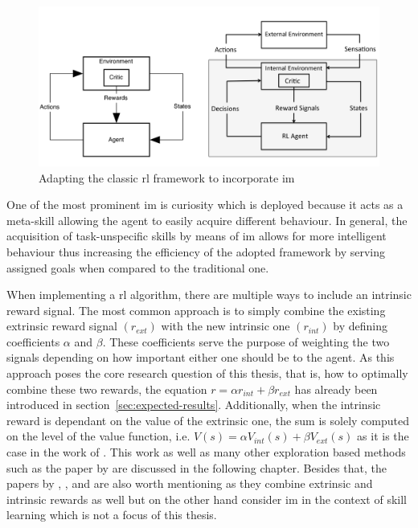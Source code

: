 \documentclass[draft,final]{vutinfth} %
\newcommand{\p}[1]{see p. #1}
\begin{document}
    \begin{figure}[h]
        \centering
        \includegraphics[width=\textwidth]{figures/adapted_rl_framework.png}
        \caption[Adapting the classic \acrlong{rl} framework to incorporate \acrlong{im}]{Adapting the classic \gls{rl} framework to incorporate \gls{im}\protect\footnotemark[4]}
        \label{fig:adapted_rl_framework}
    \end{figure}

    \footnotetext[4]{\citep[\p{2}]{singh_intrinsically_2010}}

    One of the most prominent \gls{im} is curiosity which is deployed because it acts as a meta-skill allowing the agent to easily acquire different behaviour.
    In general, the acquisition of task-unspecific skills by means of \gls{im} allows for more intelligent behaviour thus increasing the efficiency of the adopted framework by serving assigned goals when compared to the traditional one.

    When implementing a \gls{rl} algorithm, there are multiple ways to include an intrinsic reward signal.
    The most common approach is to simply combine the existing extrinsic reward signal $(r_{ext})$ with the new intrinsic one $(r_{int})$ by defining coefficients $\alpha$ and $\beta$.
    These coefficients serve the purpose of weighting the two signals depending on how important either one should be to the agent.
    As this approach poses the core research question of this thesis, that is, how to optimally combine these two rewards, the equation $r = \alpha r_{int} + \beta r_{ext}$ has already been introduced in section~\ref{sec:expected-results}.
    Additionally, when the intrinsic reward is dependant on the value of the extrinsic one, the sum is solely computed on the level of the value function, i.e. $V(s)=\alpha V_{int}(s) + \beta V_{ext}(s)$ as it is the case in the work of \citet{kim_curiosity-bottleneck_2019-1}.
    This work as well as many other exploration based methods such as the paper by \citet{burda_exploration_2018} are discussed in the following chapter.
    Besides that, the papers by \citeauthor{gregor_variational_2016}, \citeauthor{vezhnevets_feudal_2017}, and \citeauthor{huang_learning_2019} are also worth mentioning as they combine extrinsic and intrinsic rewards as well but on the other hand consider \gls{im} in the context of skill learning which is not a focus of this thesis.
\end{document}
